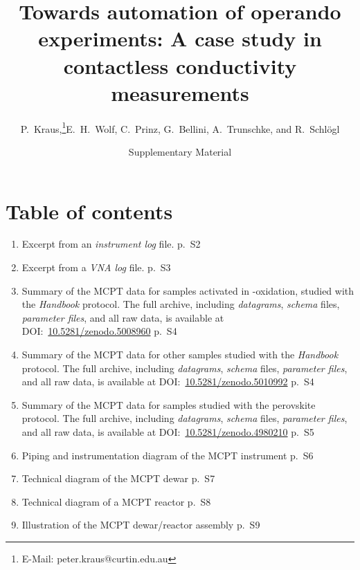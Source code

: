 \documentclass[12pt]{article}
\newcommand{\beginsupplement}{%
        \setcounter{table}{0}
        \renewcommand{\thetable}{S\arabic{table}}%
        \setcounter{figure}{0}
        \renewcommand{\thefigure}{S\arabic{figure}}%
        \renewcommand{\thepage}{S\arabic{page}}%
     }
\begin{document}
\title{Towards automation of operando experiments: A case study in contactless conductivity measurements}

\date{Supplementary Material}

\author{P.~Kraus,\thanks{E-Mail: peter.kraus@curtin.edu.au}\hspace{7pt}E.~H.~Wolf,
        C.~Prinz, G.~Bellini, A.~Trunschke, and R.~Schl\"{o}gl}

\maketitle




\beginsupplement

\section*{Table of contents}
\begin{enumerate}
	\item Excerpt from an \emph{instrument log} file. \hfill p.~S2
    \item Excerpt from a \emph{VNA log} file. \hfill p.~S3
	\item Summary of the MCPT data for samples activated in -oxidation, studied with the \emph{Handbook} protocol. The full archive, including \emph{datagrams}, \emph{schema} files, \emph{parameter files}, and all raw data, is available at DOI:~\href{https://doi.org/10.5281/zenodo.5008960}{10.5281/zenodo.5008960}  \hfill p.~S4
    \item Summary of the MCPT data for other samples studied with the \emph{Handbook} protocol. The full archive, including \emph{datagrams}, \emph{schema} files, \emph{parameter files}, and all raw data, is available at DOI:~\href{https://doi.org/10.5281/zenodo.5010992}{10.5281/zenodo.5010992}  \hfill p.~S4
    \item Summary of the MCPT data for samples studied with the perovskite protocol. The full archive, including \emph{datagrams}, \emph{schema} files, \emph{parameter files}, and all raw data, is available at DOI:~\href{https://doi.org/10.5281/zenodo.4980210}{10.5281/zenodo.4980210} \hfill p.~S5
    \item Piping and instrumentation diagram of the MCPT instrument \hfill p.~S6
	\item Technical diagram of the MCPT dewar \hfill p.~S7
	\item Technical diagram of a MCPT reactor \hfill p.~S8
	\item Illustration of the MCPT dewar/reactor assembly \hfill p.~S9
\end{enumerate}
\end{document}
